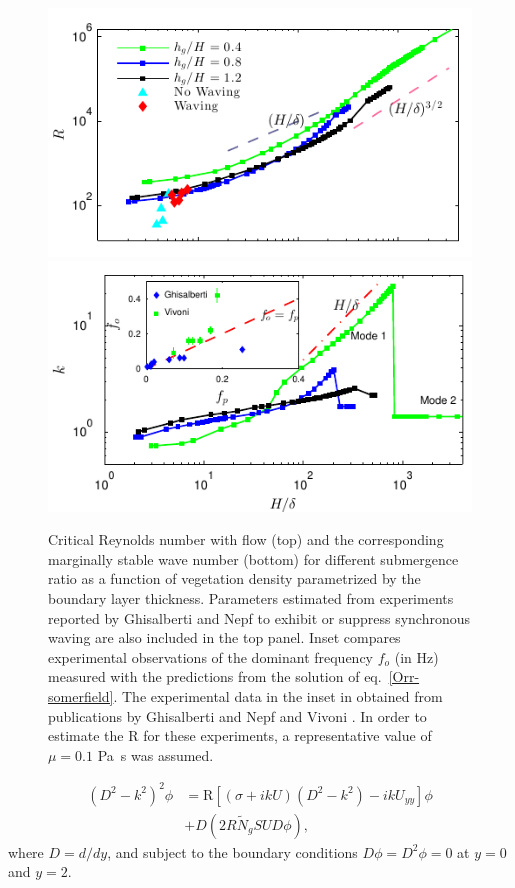 \documentclass[aps,prl,twocolumn,superscriptaddress,10pt]{revtex4-1}  %
\newcommand{\Rey}{\text{R}}
\newcommand{\Ndg}{\tilde{N}_g}
\begin{document}
\begin{figure}
\begin{center}
\includegraphics[]{Critical_Re_vs_delta_noshear} \\
\vspace{-6mm} \hspace{-3mm}
\includegraphics[]{K_vs_shear_width_noshear}
\end{center}
\caption{Critical Reynolds number with flow (top) and the corresponding marginally stable wave number (bottom) for different submergence ratio as a function of vegetation density
 parametrized by the boundary layer thickness. Parameters estimated from experiments reported by Ghisalberti and Nepf \cite{Ghisal02} to exhibit or suppress synchronous waving are 
also included in the top panel. Inset compares experimental observations 
of the dominant frequency $f_o$ (in Hz) measured with the predictions from the solution of eq.~\eqref{Orr-somerfield}. The experimental data in the inset in obtained from publications by 
Ghisalberti and Nepf \cite{Ghisal02} and Vivoni \cite{Vivoni98}. In order to estimate the $\Rey$ for these experiments, a representative value of $\mu=0.1$ Pa~s was assumed.}
\label{Re_vs_delta}
\end{figure}
\begin{equation}
\begin{split}
\left(D^2 -k^{2} \right)^2\phi &= \Rey \left[ \left({\sigma}+ikU\right) \left(D^2-k^2\right) -ikU_{yy}\right]\phi \\
&+D\left(2R \Ndg S U D \phi\right),
\label{Orr-somerfield}
\end{split}
\end{equation}
where $D=d/dy$, and subject to the boundary conditions $D\phi = D^2\phi = 0$ at $y=0$ and $y=2$. 
\end{document}

